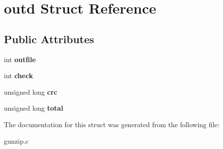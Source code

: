 \hypertarget{structoutd}{
\section{outd Struct Reference}
\label{structoutd}
}
\subsection*{Public Attributes}
\begin{DoxyCompactItemize}
\item 
\hypertarget{structoutd_a5082d9db14154a733403decdf852e9e8}{
int {\bfseries outfile}}
\label{structoutd_a5082d9db14154a733403decdf852e9e8}

\item 
\hypertarget{structoutd_a3e4575647d91f09865b59b4097f16583}{
int {\bfseries check}}
\label{structoutd_a3e4575647d91f09865b59b4097f16583}

\item 
\hypertarget{structoutd_a5408635b43ee66015daca92aa117aa51}{
unsigned long {\bfseries crc}}
\label{structoutd_a5408635b43ee66015daca92aa117aa51}

\item 
\hypertarget{structoutd_a14d1b98be9ddb6c511a029815f96874a}{
unsigned long {\bfseries total}}
\label{structoutd_a14d1b98be9ddb6c511a029815f96874a}

\end{DoxyCompactItemize}


The documentation for this struct was generated from the following file:\begin{DoxyCompactItemize}
\item 
gunzip.c\end{DoxyCompactItemize}
